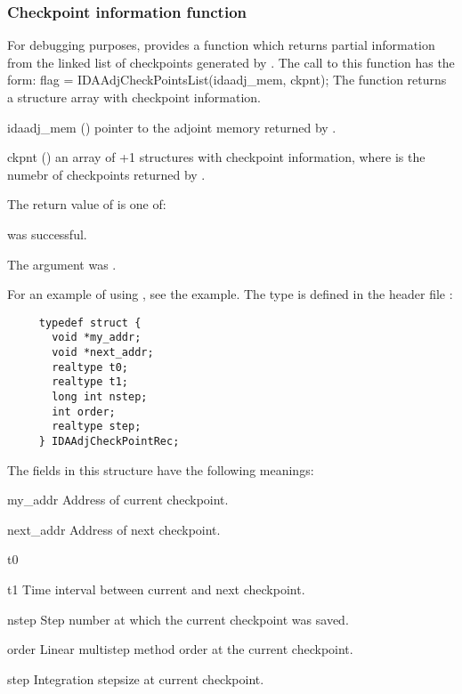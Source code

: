 \subsubsection{Checkpoint information function}
For debugging purposes, {\idas} provides a function  which
returns partial information from the linked list of checkpoints generated by
. The call to this function has the form:
{
  flag = IDAAdjCheckPointsList(idaadj\_mem, ckpnt);
}
{
  The function  returns a structure array
  with checkpoint information.
}
{  
  \begin{args}
  \item[idaadj\_mem] ()
    pointer to the adjoint memory returned by .
  \item[ckpnt] ()
    an array of +1 structures with checkpoint information, where
     is the numebr of checkpoints returned by .
  \end{args}
}
{
  The return value  of  is one of:
  \begin{args}
  \item[\Id{IDA\_SUCCESS}] 
     was successful.
  \item[\Id{IDA\_ADJMEM\_NULL}]
    The  argument was .
  \end{args}
}
{
  For an example of using , see the  
  example.
}
The type  is defined in the header file :
\begin{verbatim}
     typedef struct {
       void *my_addr;
       void *next_addr;
       realtype t0;
       realtype t1;
       long int nstep;
       int order;
       realtype step;
     } IDAAdjCheckPointRec;
\end{verbatim}
The fields in this structure have the following meanings:
\begin{args}
\item[my\_addr]
  Address of current checkpoint.
\item[next\_addr]
  Address of next checkpoint.
\item[t0]
\item[t1]
  Time interval between current and next checkpoint.
\item[nstep]
  Step number at which the current checkpoint was saved.
\item[order]
  Linear multistep method order at the current checkpoint.
\item[step]
  Integration stepsize at current checkpoint.
\end{args}
